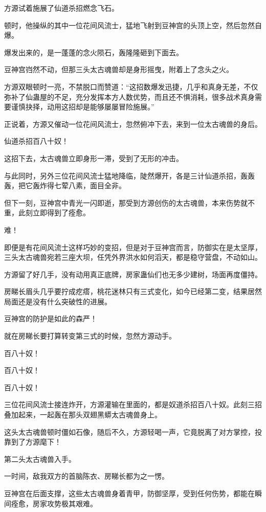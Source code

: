 \begin{this_body}
方源试着施展了仙道杀招燃念飞石。

顿时，他操纵的其中一位花间风流士，猛地飞射到豆神宫的头顶上空，然后忽然自爆。

爆发出来的，是一蓬蓬的念火陨石，轰隆隆砸到下面去。

豆神宫岿然不动，但那三头太古魂兽却是身形摇曳，附着上了念头之火。

方源双眼顿时一亮，不禁脱口而赞道：“这招数爆发迅捷，几乎和真身无差，不仅弥补了仙蛊屋的不足，充分发挥本方人数优势，而且还不惧消耗，很多战术真身需要谨慎抉择，动用这招却是能够屡屡冒险施展。”

正说着，方源又催动一位花间风流士，忽然俯冲下去，来到一位太古魂兽的身后。

仙道杀招百八十奴！

这招下去，太古魂兽立即身形一滞，受到了无形的冲击。

与此同时，另外三位花间风流士猛地降临，陡然爆开，各是三计仙道杀招，轰轰轰，把它轰炸得七荤八素，面目全非。

但下一刻，豆神宫中青光一闪即逝，那受到方源创伤的太古魂兽，本来伤势就不重，此刻立即得到了痊愈。

难！

即便是有花间风流士这样巧妙的变招，但是对于豆神宫而言，防御实在是太坚厚，三头太古魂兽宛若三座大坝，任凭外界洪水如何滔天，都是稳守营盘，不动如山。

方源留了好几手，没有动用真正底牌，房家蛊仙们也无多少建树，场面再度僵持。

房睇长眉头几乎要拧成疙瘩，桃花迷林只有三式变化，如今已经第二变，结果居然局面还是没有什么突破性的进展。

豆神宫的防护是如此的森严！

就在房睇长要打算转变第三式的时候，忽然方源动手。

百八十奴！

百八十奴！

百八十奴！

三位花间风流士接连炸开，方源灌输在里面的，都是奴道杀招百八十奴。此刻三招叠加起来，一起轰在那头双翅黑蟒太古魂兽身上。

这头太古魂兽顿时僵如石像，随后不久，方源轻喝一声，它竟脱离了对方掌控，投靠到了方源麾下！

第二头太古魂兽入手。

一时间，敌我双方的首脑陈衣、房睇长都为之一愣。

豆神宫在后面支撑，这些太古魂兽身着青甲，防御坚厚，受到任何伤势，都能在瞬间痊愈，房家攻势极其艰难。


\end{this_body}
